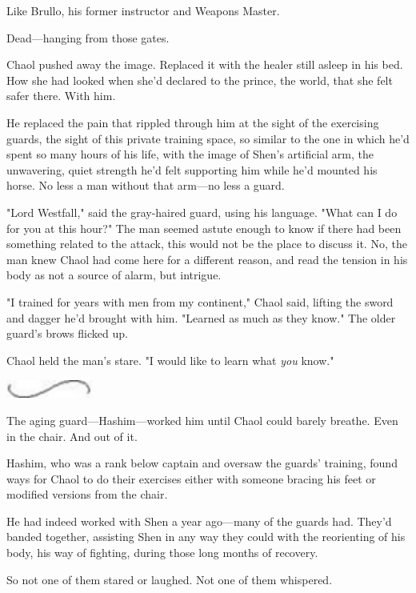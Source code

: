 Like Brullo, his former instructor and Weapons Master.

Dead---hanging from those gates.

Chaol pushed away the image.
Replaced it with the healer still asleep in his bed.
How she had looked when she'd declared to the prince, the world, that she felt safer there.
With him.

He replaced the pain that rippled through him at the sight of the exercising guards, the sight of this private training space, so similar to the one in which he'd spent so many hours of his life, with the image of Shen's artificial arm, the unwavering, quiet strength he'd felt supporting him while he'd mounted his horse.
No less a man without that arm---no less a guard.

"Lord Westfall," said the gray-haired guard, using his language.
"What can I do for you at this hour?"
The man seemed astute enough to know if there had been something related to the attack, this would not be the place to discuss it.
No, the man knew Chaol had come here for a different reason, and read the tension in his body as not a source of alarm, but intrigue.

"I trained for years with men from my continent," Chaol said, lifting the sword and dagger he'd brought with him.
"Learned as much as they know."
The older guard's brows flicked up.

Chaol held the man's stare.
"I would like to learn what \emph{you}
know."

\begin{center}
	\includegraphics[width=1.12in,height=0.24in]{images/seperator}
\end{center}

The aging guard---Hashim---worked him until Chaol could barely breathe.
Even in the chair.
And out of it.

Hashim, who was a rank below captain and oversaw the guards' training, found ways for Chaol to do their exercises either with someone bracing his feet or modified versions from the chair.

He had indeed worked with Shen a year ago---many of the guards had.
They'd banded together, assisting Shen in any way they could with the reorienting of his body, his way of fighting, during those long months of recovery.

So not one of them stared or laughed.
Not one of them whispered.

